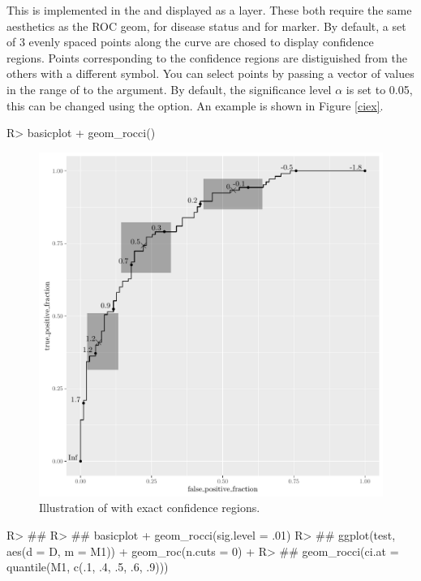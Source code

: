 \documentclass[codesnippet]{jss}
\begin{document}
This is implemented in the  and displayed as a
 layer. These both require the same aesthetics as the
ROC geom,  for disease status and  for marker. By
default, a set of 3 evenly spaced points along the curve are chosed to
display confidence regions. Points corresponding to the confidence
regions are distiguished from the others with a different symbol. You
can select points by passing a vector of values in the range of 
to the  argument. By default, the significance level
\(\alpha\) is set to 0.05, this can be changed using the
 option. An example is shown in Figure \ref{ciex}.

\begin{Schunk}
\begin{Sinput}
R> basicplot + geom_rocci()
\end{Sinput}
\begin{figure}
\includegraphics{figure/test-a-ci-1} \caption{Illustration of  with exact confidence regions. \label{ciex}}\label{fig:test-a-ci}
\end{figure}
\begin{Sinput}
R> ## 
R> ## basicplot + geom_rocci(sig.level = .01)
R> ## ggplot(test, aes(d = D, m = M1)) + geom_roc(n.cuts = 0) +
R> ##   geom_rocci(ci.at = quantile(M1, c(.1, .4, .5, .6, .9)))
\end{Sinput}
\end{Schunk}
\end{document}
